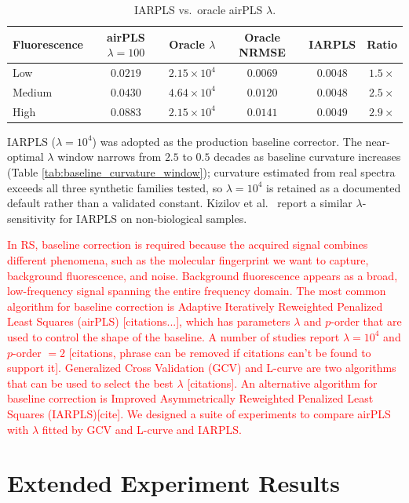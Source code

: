 \begin{table}[H]
\centering
\small
\caption{IARPLS vs.\ oracle airPLS $\lambda$.}
\label{tab:baseline_oracle}
\begin{tabular*}{\textwidth}{@{\extracolsep{\fill}}lccccc}
\toprule
Fluorescence & airPLS $\lambda=100$ & Oracle $\lambda$ & Oracle NRMSE & IARPLS & Ratio \\
\midrule
Low & $0.0219$ & $2.15\times10^4$ & $0.0069$ & $0.0048$ & $1.5\times$ \\
Medium & $0.0430$ & $4.64\times10^4$ & $0.0120$ & $0.0048$ & $2.5\times$ \\
High & $0.0883$ & $2.15\times10^4$ & $0.0141$ & $0.0049$ & $2.9\times$ \\
\bottomrule
\end{tabular*}
\end{table}

IARPLS ($\lambda=10^4$) was adopted as the production baseline corrector. The near-optimal $\lambda$ window narrows from $2.5$ to $0.5$ decades as baseline curvature increases (Table \ref{tab:baseline_curvature_window}); curvature estimated from real spectra exceeds all three synthetic families tested, so $\lambda=10^4$ is retained as a documented default rather than a validated constant. Kizilov et al.\ \cite{Kizilov2026} report a similar $\lambda$-sensitivity for IARPLS on non-biological samples.

\newpage

\textcolor{red}{In RS, baseline correction is required because the acquired signal combines different phenomena, such as the molecular fingerprint we want to capture, background fluorescence, and noise. Background fluorescence appears as a broad, low-frequency signal spanning the entire frequency domain. The most common algorithm for baseline correction is Adaptive Iteratively Reweighted Penalized Least Squares (airPLS) [citations...], which has parameters $\lambda$ and $p$-order that are used to control the shape of the baseline. A number of studies report $\lambda = 10^4$ and $p$-order $=2$ [citations, phrase can be removed if citations can't be found to support it]. Generalized Cross Validation (GCV) and L-curve are two algorithms that can be used to select the best $\lambda$ [citations]. An alternative algorithm for baseline correction is Improved Asymmetrically Reweighted Penalized Least Squares (IARPLS)[cite]. We designed a suite of experiments to compare airPLS with $\lambda$ fitted by GCV and L-curve and IARPLS.}

\section{Extended Experiment Results}
\label{app:exp_results}
\setcounter{table}{0}
\renewcommand{\thetable}{\Alph{section}.\arabic{table}}

